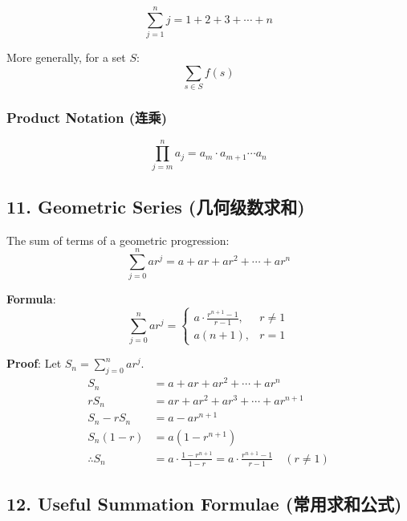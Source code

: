 \documentclass[10pt,a4paper,openany]{ctexbook}
\theoremstyle{definition}
\theoremstyle{remark}
\begin{document}
\[
\sum_{j=1}^{n} j = 1 + 2 + 3 + \cdots + n
\]

More generally, for a set $S$:
\[
\sum_{s \in S} f(s)
\]

\subsubsection{Product Notation (连乘)}

\[
\prod_{j=m}^{n} a_j = a_m \cdot a_{m+1} \cdots a_n
\]

\vspace{-2pt}

\subsection{11. Geometric Series (几何级数求和)}

The sum of terms of a geometric progression:
\[
\sum_{j=0}^{n} ar^j = a + ar + ar^2 + \cdots + ar^n
\]

\textbf{Formula}:
\[
\sum_{j=0}^{n} ar^j = \begin{cases}
a \cdot \frac{r^{n+1} - 1}{r - 1}, & r \neq 1 \\[6pt]
a(n+1), & r = 1
\end{cases}
\]

\textbf{Proof}: Let $S_n = \sum_{j=0}^{n} ar^j$.
\[
\begin{aligned}
S_n &= a + ar + ar^2 + \cdots + ar^n \\
rS_n &= ar + ar^2 + ar^3 + \cdots + ar^{n+1} \\
S_n - rS_n &= a - ar^{n+1} \\
S_n(1 - r) &= a(1 - r^{n+1}) \\
\therefore S_n &= a \cdot \frac{1 - r^{n+1}}{1 - r} = a \cdot \frac{r^{n+1} - 1}{r - 1} \quad (r \neq 1)
\end{aligned}
\]

\vspace{-2pt}

\subsection{12. Useful Summation Formulae (常用求和公式)}
\end{document}

